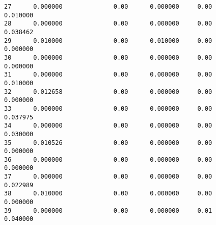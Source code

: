 \documentclass[11pt]{article}
\begin{document}
\begin{tcolorbox}[breakable, size=fbox, boxrule=.5pt, pad at break*=1mm, opacityfill=0]
\begin{Verbatim}[commandchars=\\\{\}]
27      0.000000              0.00      0.000000     0.00       0.010000
28      0.000000              0.00      0.000000     0.00       0.038462
29      0.010000              0.00      0.010000     0.00       0.000000
30      0.000000              0.00      0.000000     0.00       0.000000
31      0.000000              0.00      0.000000     0.00       0.010000
32      0.012658              0.00      0.000000     0.00       0.000000
33      0.000000              0.00      0.000000     0.00       0.037975
34      0.000000              0.00      0.000000     0.00       0.030000
35      0.010526              0.00      0.000000     0.00       0.000000
36      0.000000              0.00      0.000000     0.00       0.000000
37      0.000000              0.00      0.000000     0.00       0.022989
38      0.010000              0.00      0.000000     0.00       0.000000
39      0.000000              0.00      0.000000     0.01       0.040000


\end{Verbatim}
\end{tcolorbox}
\end{document}
